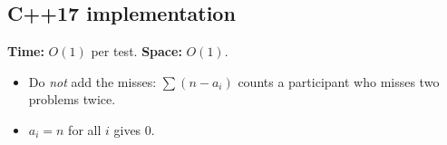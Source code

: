 \subsection*{C++17 implementation}

\begin{complexitybox}
\textbf{Time:} $O(1)$ per test. \textbf{Space:} $O(1)$.
\end{complexitybox}

\begin{pitfallbox}
\begin{itemize}
  \item Do \emph{not} add the misses: $\sum(n-a_i)$ counts a participant
        who misses two problems twice.
  \item $a_i=n$ for all $i$ gives $0$.
\end{itemize}
\end{pitfallbox}
